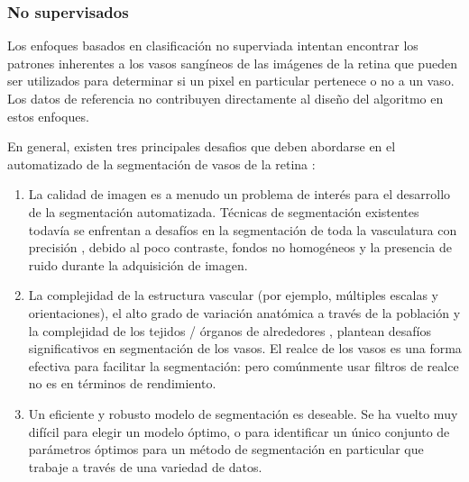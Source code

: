 	\subsubsection{No supervisados}


Los enfoques basados en clasificaci\'on no superviada intentan encontrar los patrones inherentes a los vasos sang\'ineos de las im\'agenes de la retina que pueden ser utilizados para determinar si un pixel en particular pertenece o no a un vaso. Los datos de referencia no contribuyen directamente al dise\~no del algoritmo en estos enfoques.

En general, existen tres principales desafios que deben abordarse en el automatizado de la segmentación de vasos de la retina :
\begin{enumerate}
\item La calidad de imagen es a menudo un problema de interés para el desarrollo de la segmentación automatizada. Técnicas de segmentación existentes todavía se enfrentan a desafíos en la segmentación de toda la vasculatura con precisión , debido al poco contraste, fondos no homogéneos y la presencia de ruido durante la adquisición de imagen.
\item La complejidad de la estructura vascular (por ejemplo, múltiples escalas y orientaciones), el alto grado de variación anatómica a través de la población y la complejidad de los tejidos / órganos de alrededores
, plantean desafíos significativos en segmentación de los vasos. El realce de los vasos es
una forma efectiva para facilitar la segmentación:  pero comúnmente usar filtros de realce no es en términos de rendimiento.
\item Un eficiente y robusto modelo de segmentación  es deseable. Se ha vuelto muy difícil
para elegir un modelo óptimo, o para identificar un único conjunto de parámetros óptimos para un método de segmentación en particular que trabaje a través de una variedad de datos.\cite{zhao2015retinal}
\end{enumerate}


